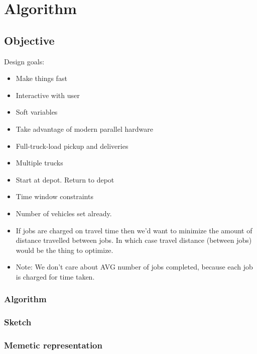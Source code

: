 
\chapter{Algorithm}


\section{Objective}

Design goals:
\begin{itemize}
   \item Make things fast
	\item Interactive with user
	\item Soft variables
	\item Take advantage of modern parallel hardware
\end{itemize}


\begin{itemize}
	\item Full-truck-load pickup and deliveries
	\item Multiple trucks
	\item Start at depot. Return to depot
	\item Time window constraints
	\item Number of vehicles set already.
	\item If jobs are charged on travel time then we'd want to minimize the amount of distance travelled between jobs. In which case travel distance (between jobs) would be the thing to optimize.
	\item Note: We don't care about AVG number of jobs completed, because each job is charged for time taken. 
\end{itemize}


\subsection{Algorithm}

\subsection{Sketch}


\subsection{Memetic representation}

